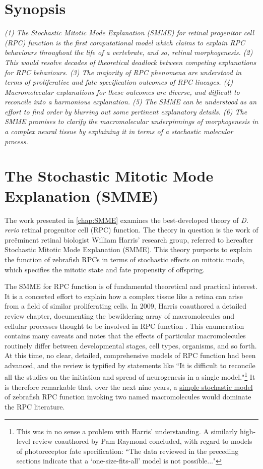\documentclass{ut-thesis}
\begin{document}
\begin{NoHyper}
\section*{Synopsis}
\textit{(1) The Stochastic Mitotic Mode Explanation (SMME) for retinal progenitor cell (RPC) function is the first computational model which claims to explain RPC behaviours throughout the life of a vertebrate, and so, retinal morphogenesis. (2) This would resolve decades of theoretical deadlock between competing explanations for RPC behaviours. (3) The majority of RPC phenomena are understood in terms of proliferative and fate specification outcomes of RPC lineages. (4) Macromolecular explanations for these outcomes are diverse, and difficult to reconcile into a harmonious explanation. (5) The SMME can be understood as an effort to find order by blurring out some pertinent explanatory details. (6) The SMME promises to clarify the macromolecular underpinnings of morphogenesis in a complex neural tissue by explaining it in terms of a stochastic molecular process.}

\section{The Stochastic Mitotic Mode Explanation (SMME)}
The work presented in \autoref{chap:SMME} examines the best-developed theory of \textit{D. rerio} retinal progenitor cell (RPC) function. The theory in question is the work of pre\"{e}minent retinal biologist William Harris' research group, referred to hereafter Stochastic Mitotic Mode Explanation (SMME). This theory purports to explain the function of zebrafish RPCs in terms of stochastic effects on mitotic mode, which specifies the mitotic state and fate propensity of offspring.

The SMME for RPC function is of fundamental theoretical and practical interest. It is a concerted effort to explain how a complex tissue like a retina can arise from a field of similar proliferating cells. In 2009, Harris coauthored a detailed review chapter, documenting the bewildering array of macromolecules and cellular processes thought to be involved in RPC function \cite{Agathocleous2009}. This enumeration contains many caveats and notes that the effects of particular macromolecules routinely differ between developmental stages, cell types, organisms, and so forth. At this time, no clear, detailed, comprehensive models of RPC function had been advanced, and the review is typified by statements like ``It is difficult to reconcile all the studies on the initiation and spread of neurogenesis in a single model."\footnote{This was in no sense a problem with Harris' understanding. A similarly high-level review coauthored by Pam Raymond \cite{Adler2008} concluded, with regard to models of photoreceptor fate specification: ``The data reviewed in the preceding sections indicate that a ‘one-size-fits-all’ model is not possible..."} It is therefore remarkable that, over the next nine years, a \hyperref[ssec:SSM]{simple stochastic model} of zebrafish RPC function invoking two named macromolecules would dominate the RPC literature.


\end{NoHyper}
\end{document}
